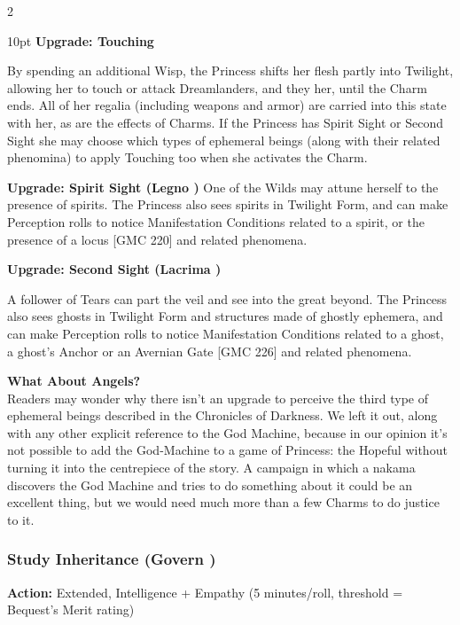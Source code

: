 \begin{multicols}{2}
\begin{myindentpar}{10pt}
\textbf{Upgrade: Touching}
 
By spending an additional Wisp, the Princess shifts her flesh partly into Twilight, allowing her to touch or attack Dreamlanders, and they her, until the Charm ends. All of her regalia (including weapons and armor) are carried into this state with her, as are the effects of Charms. If the Princess has Spirit Sight or Second Sight she may choose which types of ephemeral beings (along with their related phenomina) to apply Touching too when she activates the Charm. 

\textbf{Upgrade: Spirit Sight (Legno \textbullet)}
One of the Wilds may attune herself to the presence of spirits. The Princess also sees spirits in Twilight Form, and can make Perception rolls to notice Manifestation Conditions related to a spirit, or the presence of a locus [GMC 220] and related phenomena.

\textbf{Upgrade: Second Sight (Lacrima \textbullet)}

A follower of Tears can part the veil and see into the great beyond. The Princess also sees ghosts in Twilight Form and structures made of ghostly ephemera, and can make Perception rolls to notice Manifestation Conditions related to a ghost, a ghost’s Anchor or an Avernian Gate [GMC 226] and related phenomena.\end{myindentpar}

\begin{mybox}

\noindent\textbf{What About Angels?} \\

\noindent Readers may wonder why there isn’t an upgrade to perceive the third type of ephemeral beings described in the Chronicles of Darkness. We left it out, along with any other explicit reference to the God Machine, because in our opinion it’s not possible to add the God-Machine to a game of Princess: the Hopeful without turning it into the centrepiece of the story. A campaign in which a nakama discovers the God Machine and tries to do something about it could be an excellent thing, but we would need much more than a few Charms to do justice to it.\end{mybox}


\subsubsection*{Study Inheritance (Govern \textbullet)}

\noindent \textbf{Action:} Extended, Intelligence + Empathy (5 minutes/roll, threshold = Bequest's Merit rating)


\end{multicols}

